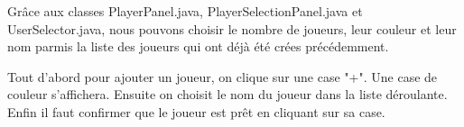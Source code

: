 Grâce aux classes PlayerPanel.java, PlayerSelectionPanel.java et UserSelector.java, nous pouvons choisir le nombre de joueurs, leur couleur et leur nom parmis la liste des joueurs qui ont déjà été crées précédemment.

Tout d'abord pour ajouter un joueur, on clique sur une case "+". Une case de couleur s'affichera. Ensuite on choisit le nom du joueur dans la liste déroulante. Enfin il faut confirmer que le joueur est prêt en cliquant sur sa case.

\begin{figure}
    \centering
    \qquad
    \qquad

\end{figure}
